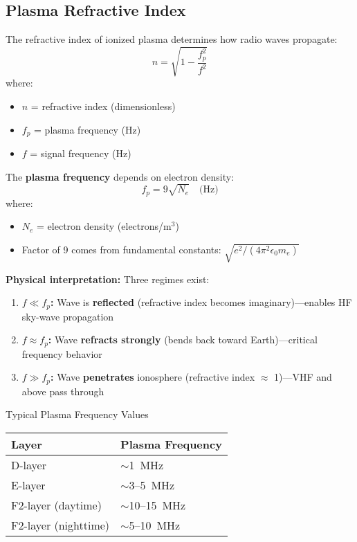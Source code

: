 \subsection{Plasma Refractive Index}

The refractive index of ionized plasma determines how radio waves propagate:
\begin{equation}
n = \sqrt{1 - \frac{f_p^2}{f^2}}
\end{equation}
where:
\begin{itemize}
\item $n$ = refractive index (dimensionless)
\item $f_p$ = plasma frequency (Hz)
\item $f$ = signal frequency (Hz)
\end{itemize}

The \textbf{plasma frequency} depends on electron density:
\begin{equation}
f_p = 9\sqrt{N_e} \quad \text{(Hz)}
\end{equation}
where:
\begin{itemize}
\item $N_e$ = electron density (electrons/m$^3$)
\item Factor of 9 comes from fundamental constants: $\sqrt{e^2/(4\pi^2 \epsilon_0 m_e)}$
\end{itemize}

\textbf{Physical interpretation:} Three regimes exist:

\begin{enumerate}
\item \textbf{$f \ll f_p$:} Wave is \textbf{reflected} (refractive index becomes imaginary)---enables HF sky-wave propagation
\item \textbf{$f \approx f_p$:} Wave \textbf{refracts strongly} (bends back toward Earth)---critical frequency behavior
\item \textbf{$f \gg f_p$:} Wave \textbf{penetrates} ionosphere (refractive index $\approx$ 1)---VHF and above pass through
\end{enumerate}

\begin{calloutbox}{Typical Plasma Frequency Values}
\begin{tabular}{@{}ll@{}}
\toprule
Layer & Plasma Frequency \\
\midrule
D-layer & $\sim$1~MHz \\
E-layer & $\sim$3--5~MHz \\
F2-layer (daytime) & $\sim$10--15~MHz \\
F2-layer (nighttime) & $\sim$5--10~MHz \\
\bottomrule
\end{tabular}
\end{calloutbox}

